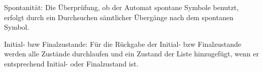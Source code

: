 Spontanität: Die Überprüfung, ob der Automat spontane Symbole benutzt, erfolgt durch ein Durchsuchen sämtlicher Übergänge nach dem spontanen Symbol.

Initial- bzw Finalzustande: Für die Rückgabe der Initial- bzw Finalzustande werden alle Zustände durchlaufen und ein Zustand der Liste hinzugefügt, wenn er entsprechend Initial- oder Finalzustand ist.
